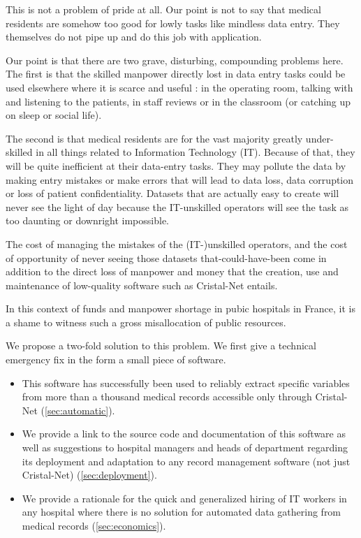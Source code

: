 \documentclass[nobib]{tufte-handout}
\begin{document}
This is not a problem of pride at all. Our point is not to say that medical residents are somehow too good for lowly tasks like mindless data entry. They themselves do not pipe up and do this job with application.

Our point is that there are two grave, disturbing, compounding problems here. The first is that the skilled manpower directly lost in data entry tasks could be used elsewhere where it is scarce and useful : in the operating room, talking with and listening to the patients, in staff reviews or in the classroom (or catching up on sleep or social life).

The second is that medical residents are for the vast majority greatly under-skilled in all things related to Information Technology (IT). Because of that, they will be quite inefficient at their data-entry tasks. They may pollute the data by making entry mistakes or make errors that will lead to data loss, data corruption or loss of patient confidentiality. Datasets that are actually easy to create will never see the light of day because the IT-unskilled operators will see the task as too daunting or downright impossible.

The cost of managing the mistakes of the (IT-)unskilled operators, and the cost of opportunity of never seeing those datasets that-could-have-been come in addition  to the direct loss of manpower and money that the creation, use and maintenance of low-quality software such as Cristal-Net entails.

In this context of funds and manpower shortage in pubic hospitals in France, it is a shame to witness such a gross misallocation of public resources.

We propose a two-fold solution to this problem. We first give a technical emergency fix in the form a small piece of software.
\begin{itemize}
\item This software has successfully been used to reliably extract specific variables from more than a thousand medical records accessible only through Cristal-Net (\autoref{sec:automatic}).
\item We provide a link to the source code and documentation of this software as well as suggestions to hospital managers and heads of department regarding its deployment and adaptation to any record management software (not just Cristal-Net) (\autoref{sec:deployment}).
\item We provide a rationale for the quick and generalized hiring of IT workers in any hospital where there is no solution for automated data gathering from medical records (\autoref{sec:economics}).
\end{itemize}
\end{document}
